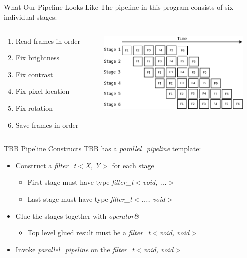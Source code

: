 \documentclass[xcolor=dvipsnames]{beamer}
\begin{document}
		\subsection{} 
			\begin{frame}{What Our Pipeline Looks Like}
				The pipeline in this program consists of six individual stages:
				\begin{columns}
					\begin{column}{0.35\textwidth}
						\begin{enumerate}
							\item Read frames in order
							\item Fix brightness
							\item Fix contrast
							\item Fix pixel location
							\item Fix rotation
							\item Save frames in order
						\end{enumerate}
					\end{column}
					\begin{column}{0.65\textwidth}
						\centering \includegraphics[width=2.9in]{images/pipelineDescDiagram}
					\end{column}
				\end{columns}	
			\end{frame}
			
			
			\begin{frame}{TBB Pipeline Constructs}
				TBB has a \textit{parallel\_pipeline} template:
				\begin{itemize}[<+->]
					\item Construct a \textit{filter\_t$<$X, Y$>$} for each stage
						\begin{itemize}
							\item First stage must have type \textit{filter\_t$<$void, ...$>$}
							\item Last stage must have type \textit{filter\_t$<$..., void$>$}
						\end{itemize}
					\item Glue the stages together with \textit{operator\&}
						\begin{itemize}
							\item Top level glued result must be a \textit{filter\_t$<$void, void$>$}
						\end{itemize}
					\item Invoke \textit{parallel\_pipeline} on the \textit{filter\_t$<$void, void$>$}
				\end{itemize}
			\end{frame} 
	
\end{document}
